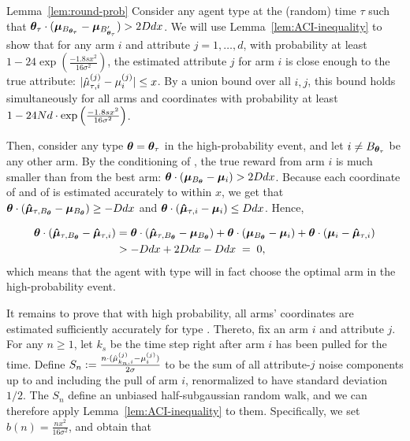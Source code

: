 \begin{extraproof}{Lemma~\ref{lem:round-prob}}
Consider any agent type \AgentV{\tau} at the (random) time $\tau$ such that
$\bm{\theta}_{\tau} \cdot (\bm{\mu}_{B_{\bm{\theta}_{\tau}}} - \bm{\mu}_{B'_{\bm{\theta}_{\tau}}})
> 2D d x$.
We will use Lemma~\ref{lem:ACI-inequality} to show that
for any arm $i$ and attribute $j = 1, \ldots, d$,
with probability at least
$1 - 24 \exp \left( \frac{-1.8 s x^2}{16\sigma^2} \right)$,
the estimated attribute $j$ for arm $i$ is close enough to the true attribute: 
$|\hat{\mu}_{\tau,i}^{(j)} - \mu_{i}^{(j)}| \leq x$.
By a union bound over all $i, j$, this bound holds simultaneously for all
arms and coordinates with probability at least
$1 - 24 N d \cdot \exp \left( \frac{-1.8 s x^2}{16\sigma^2} \right)$.

Then, consider any type $\bm{\theta} = \bm{\theta}_{\tau}$ in the high-probability event,
and let $i \neq B_{\bm{\theta}_{\tau}}$ be any other arm.
By the conditioning of \AgentV{\tau}, the true reward from arm $i$ is
much smaller than from the best arm:
$\bm{\theta} \cdot (\bm{\mu}_{B_{\bm{\theta}}} - \bm{\mu}_{i}) > 2D d x$.
Because each coordinate of \ArmEV{\tau}{\Best{\AgV}} and of
 is estimated accurately to within $x$, 
we get that 
$\bm{\theta} \cdot (\bm{\hat{\mu}}_{\tau,B_{\bm{\theta}}} - \bm{\mu}_{B_{\bm{\theta}}})
\geq - D d x$
and
$\bm{\theta} \cdot (\bm{\hat{\mu}}_{\tau,i} - \bm{\mu}_{i}) \leq D d x$.
Hence, 

\begin{align*}
\bm{\theta} \cdot (\bm{\hat{\mu}}_{\tau,B_{\bm{\theta}}} - \bm{\hat{\mu}}_{\tau,i})
& =
\bm{\theta} \cdot (\bm{\hat{\mu}}_{\tau,B_{\bm{\theta}}} - \bm{\mu}_{B_{\bm{\theta}}})
+ \bm{\theta} \cdot (\bm{\mu}_{B_{\bm{\theta}}} - \bm{\mu}_{i})
+ \bm{\theta} \cdot (\bm{\mu}_{i} - \bm{\hat{\mu}}_{\tau,i})\\
& > -D d x + 2 D d x - D d x
\; = \; 0,
\end{align*}
which means that the agent with type \AgV will in fact choose
the optimal arm in the high-probability event.

It remains to prove that with high probability, all arms' coordinates
are estimated sufficiently accurately for type \AgentV{\tau}.
Thereto, fix an arm $i$ and attribute $j$.
For any $n \geq 1$, let $k_s$ be the time step right after arm $i$ has
been pulled for the  time.
Define
$S_n := \frac{n \cdot (\hat{\mu}_{k_n,i}^{(j)} - \mu_{i}^{(j)})}{2 \sigma}$
to be the sum of all attribute-$j$ noise components up to and
including the  pull of arm $i$,
renormalized to have standard deviation $1/2$.
The $S_n$ define an unbiased half-subgaussian random walk,
and we can therefore apply Lemma~\ref{lem:ACI-inequality} to them.
Specifically, we set $b(n) = \frac{n x^2}{16 \sigma^2}$,
and obtain that


\end{extraproof}
